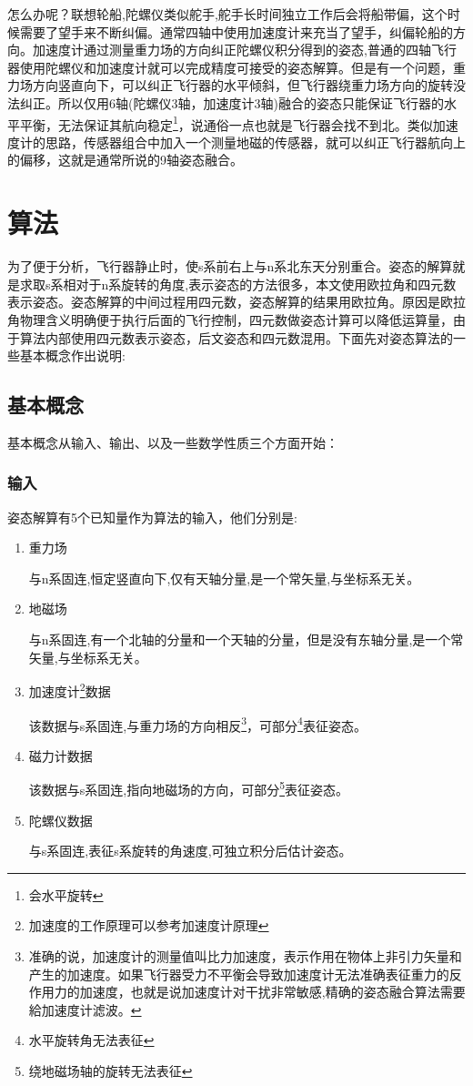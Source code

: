 \documentclass[12pt,a4paper]{article}
\renewcommand{\citep}[1]{\textsuperscript{\cite{#1}}}
\begin{document}
怎么办呢？\citep{9轴融合论文}联想轮船,陀螺仪类似舵手,舵手长时间独立工作后会将船带偏，这个时候需要了望手来不断纠偏。通常四轴中使用加速度计来充当了望手，纠偏轮船的方向。加速度计通过测量重力场的方向纠正陀螺仪积分得到的姿态,普通的四轴飞行器使用陀螺仪和加速度计就可以完成精度可接受的姿态解算。但是有一个问题，重力场方向竖直向下，可以纠正飞行器的水平倾斜，但飞行器绕重力场方向的旋转没法纠正。所以仅用6轴(陀螺仪3轴，加速度计3轴)融合的姿态只能保证飞行器的水平平衡，无法保证其航向稳定\footnote{会水平旋转}，说通俗一点也就是飞行器会找不到北。类似加速度计的思路，传感器组合中加入一个测量地磁的传感器\citep{经典博客}，就可以纠正飞行器航向上的偏移，这就是通常所说的9轴姿态融合。

\section{算法}
为了便于分析，飞行器静止时，使s系前右上与n系北东天分别重合。姿态的解算就是求取s系相对于n系旋转的角度,表示姿态的方法很多，本文使用欧拉角和四元数表示姿态。姿态解算的中间过程用四元数，姿态解算的结果用欧拉角。原因是欧拉角物理含义明确便于执行后面的飞行控制，四元数做姿态计算可以降低运算量，由于算法内部使用四元数表示姿态，后文姿态和四元数混用。下面先对姿态算法的一些基本概念作出说明:

\subsection{基本概念}
基本概念从输入、输出、以及一些数学性质三个方面开始：
\subsubsection{输入}
姿态解算有5个已知量作为算法的输入，他们分别是:
\begin{enumerate}
    \item 重力场

        与n系固连,恒定竖直向下,仅有天轴分量,是一个常矢量,与坐标系无关。
    \item 地磁场

        与n系固连,有一个北轴的分量和一个天轴的分量，但是没有东轴分量,是一个常矢量,与坐标系无关。
    \item 加速度计\footnote{加速度的工作原理可以参考加速度计原理\citep{加速度计原理}}数据

        该数据与s系固连,与重力场的方向相反\footnote{准确的说，加速度计的测量值叫比力加速度，表示作用在物体上非引力矢量和产生的加速度。如果飞行器受力不平衡会导致加速度计无法准确表征重力的反作用力的加速度，也就是说加速度计对干扰非常敏感,精确的姿态融合算法需要給加速度计滤波。}，可部分\footnote{水平旋转角无法表征}表征姿态。
    \item 磁力计数据

        该数据与s系固连,指向地磁场的方向，可部分\footnote{绕地磁场轴的旋转无法表征}表征姿态。
    \item 陀螺仪数据

        与s系固连,表征s系旋转的角速度,可独立积分后估计姿态。
\end{enumerate}
\end{document}
